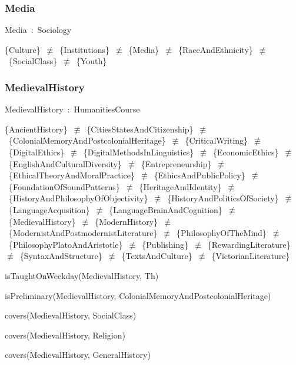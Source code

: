 \documentclass{article}
\begin{document}
\subsubsection*{Media}

Media~:~Sociology

\{Culture\}~\ensuremath{\not\equiv}~\{Institutions\}~\ensuremath{\not\equiv}~\{Media\}~\ensuremath{\not\equiv}~\{RaceAndEthnicity\}~\ensuremath{\not\equiv}~\{SocialClass\}~\ensuremath{\not\equiv}~\{Youth\}

\subsubsection*{MedievalHistory}

MedievalHistory~:~HumanitiesCourse

\{AncientHistory\}~\ensuremath{\not\equiv}~\{CitiesStatesAndCitizenship\}~\ensuremath{\not\equiv}~\{ColonialMemoryAndPostcolonialHeritage\}~\ensuremath{\not\equiv}~\{CriticalWriting\}~\ensuremath{\not\equiv}~\{DigitalEthics\}~\ensuremath{\not\equiv}~\{DigitalMethodsInLinguistics\}~\ensuremath{\not\equiv}~\{EconomicEthics\}~\ensuremath{\not\equiv}~\{EnglishAndCulturalDiversity\}~\ensuremath{\not\equiv}~\{Entrepreneurship\}~\ensuremath{\not\equiv}~\{EthicalTheoryAndMoralPractice\}~\ensuremath{\not\equiv}~\{EthicsAndPublicPolicy\}~\ensuremath{\not\equiv}~\{FoundationOfSoundPatterns\}~\ensuremath{\not\equiv}~\{HeritageAndIdentity\}~\ensuremath{\not\equiv}~\{HistoryAndPhilosophyOfObjectivity\}~\ensuremath{\not\equiv}~\{HistoryAndPoliticsOfSociety\}~\ensuremath{\not\equiv}~\{LanguageAcqusition\}~\ensuremath{\not\equiv}~\{LanguageBrainAndCognition\}~\ensuremath{\not\equiv}~\{MedievalHistory\}~\ensuremath{\not\equiv}~\{ModernHistory\}~\ensuremath{\not\equiv}~\{ModernistAndPostmodernistLiterature\}~\ensuremath{\not\equiv}~\{PhilosophyOfTheMind\}~\ensuremath{\not\equiv}~\{PhilosophyPlatoAndAristotle\}~\ensuremath{\not\equiv}~\{Publishing\}~\ensuremath{\not\equiv}~\{RewardingLiterature\}~\ensuremath{\not\equiv}~\{SyntaxAndStructure\}~\ensuremath{\not\equiv}~\{TextsAndCulture\}~\ensuremath{\not\equiv}~\{VictorianLiterature\}

isTaughtOnWeekday(MedievalHistory, Th)

isPreliminary(MedievalHistory, ColonialMemoryAndPostcolonialHeritage)

covers(MedievalHistory, SocialClass)

covers(MedievalHistory, Religion)

covers(MedievalHistory, GeneralHistory)
\end{document}
